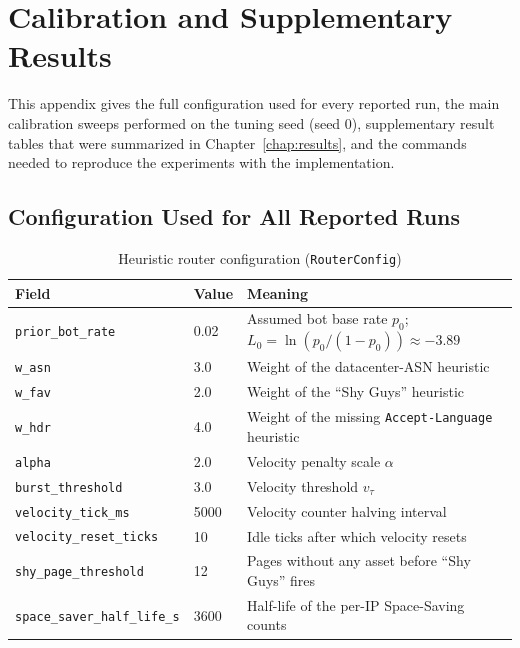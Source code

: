 \chapter{Calibration and Supplementary Results}
\label{chap:appendix_a}

This appendix gives the full configuration used for every reported run, the main calibration sweeps performed on the tuning seed (seed 0), supplementary result tables that were summarized in Chapter~\ref{chap:results}, and the commands needed to reproduce the experiments with the implementation.

\section{Configuration Used for All Reported Runs}

\begin{table}[htbp]
    \centering
    \caption{Heuristic router configuration (\texttt{RouterConfig})}
    \label{tab:app-router-config}
    \small
    \begin{tabular}{llp{}}
        \toprule
        Field & Value & Meaning \\
        \midrule
        \texttt{prior\_bot\_rate} & 0.02 & Assumed bot base rate $p_0$; $L_0 = \ln(p_0/(1-p_0)) \approx -3.89$ \\
        \texttt{w\_asn} & 3.0 & Weight of the datacenter-ASN heuristic \\
        \texttt{w\_fav} & 2.0 & Weight of the ``Shy Guys'' heuristic \\
        \texttt{w\_hdr} & 4.0 & Weight of the missing \texttt{Accept-Language} heuristic \\
        \texttt{alpha} & 2.0 & Velocity penalty scale $\alpha$ \\
        \texttt{burst\_threshold} & 3.0 & Velocity threshold $v_{\tau}$ \\
        \texttt{velocity\_tick\_ms} & 5000 & Velocity counter halving interval \\
        \texttt{velocity\_reset\_ticks} & 10 & Idle ticks after which velocity resets \\
        \texttt{shy\_page\_threshold} & 12 & Pages without any asset before ``Shy Guys'' fires \\
        \texttt{space\_saver\_half\_life\_s} & 3600 & Half-life of the per-IP Space-Saving counts \\
        \bottomrule
    \end{tabular}
\end{table}

